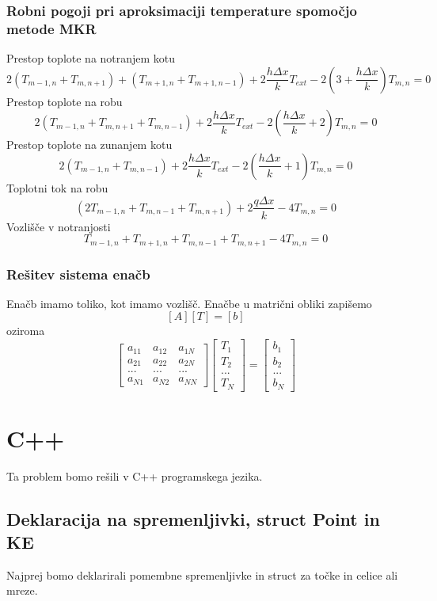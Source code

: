 \documentclass[12pt]{article}
\begin{document}
\subsubsection{Robni pogoji pri aproksimaciji temperature spomočjo metode MKR}
Prestop toplote na notranjem kotu
$$2(T_{m-1,n}+T_{m,n+1})+(T_{m+1,n}+T_{m+1,n-1})+2\frac{h \Delta x}{k}T_{ext}-2(3+\frac{h\Delta x}{k})T_{m,n}=0$$
Prestop toplote na robu
$$2(T_{m-1,n}+T_{m,n+1}+T_{m,n-1})+2\frac{h\Delta x}{k}T_{ext}-2(\frac{h\Delta x}{k}+2)T_{m,n}=0$$
Prestop toplote na zunanjem kotu
$$2(T_{m-1,n}+T_{m,n-1})+2\frac{h\Delta x}{k}T_{ext}-2(\frac{h\Delta x}{k}+1)T_{m,n}=0$$
Toplotni tok na robu
$$(2T_{m-1,n}+T_{m,n-1}+T_{m,n+1})+2\frac{q\Delta x}{k}-4T_{m,n}=0$$
Vozlišče v notranjosti
$$T_{m-1,n}+T_{m+1,n}+T_{m,n-1}+T_{m,n+1}-4T_{m,n}=0$$

\subsubsection{Rešitev sistema enačb}
Enačb imamo toliko, kot imamo vozlišč. Enačbe u matrični obliki zapišemo
$$[A][T]=[b]$$
oziroma
$$\begin{bmatrix}
a_{11} & a_{12} & a_{1N}\\
a_{21} & a_{22} & a_{2N}\\
... & ... & ...\\
a_{N1} & a_{N2} & a_{NN}
\end{bmatrix}
\begin{bmatrix}
T_{1}\\
T_{2}\\
...\\
T_{N}
\end{bmatrix}
=
\begin{bmatrix}
b_{1}\\
b_{2}\\
...\\
b_{N}
\end{bmatrix}$$

\section{C++}
Ta problem bomo rešili v C++ programskega jezika.

\FloatBarrier
\subsection{Deklaracija na spremenljivki, struct Point in KE}
    Najprej bomo deklarirali pomembne spremenljivke in struct za točke in celice ali mreze.
    
\end{document}
